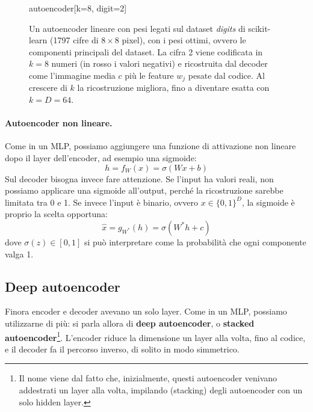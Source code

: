 \begin{figure}[htbp]
\begin{widget}{autoencoder}[k=8, digit=2]
\end{widget}
\caption{Un autoencoder lineare con pesi legati sul dataset \emph{digits} di scikit-learn (1797 cifre di $8 \times 8$ pixel), con i pesi ottimi, ovvero le componenti principali del dataset. La cifra 2 viene codificata in $k = 8$ numeri (in rosso i valori negativi) e ricostruita dal decoder come l'immagine media $c$ più le feature $w_j$ pesate dal codice. Al crescere di $k$ la ricostruzione migliora, fino a diventare esatta con $k = D = 64$.}
\label{fig:autoencoder}
\end{figure}

\paragraph{Autoencoder non lineare.} Come in un MLP, possiamo aggiungere una funzione di attivazione non lineare dopo il layer dell'encoder, ad esempio una sigmoide:
\[
    h = f_W(x) = \sigma(Wx + b)
\]
Sul decoder bisogna invece fare attenzione. Se l'input ha valori reali, non possiamo applicare una sigmoide all'output, perché la ricostruzione sarebbe limitata tra 0 e 1. Se invece l'input è binario, ovvero $x \in \{0, 1\}^D$, la sigmoide è proprio la scelta opportuna:
\[
    \hat{x} = g_{W^*}(h) = \sigma(W^*h + c)
\]
dove $\sigma(z) \in [0, 1]$ si può interpretare come la probabilità che ogni componente valga 1.

\subsection{Deep autoencoder}\label{sec:deep-autoencoder}
Finora encoder e decoder avevano un solo layer. Come in un MLP, possiamo utilizzarne di più: si parla allora di \textbf{deep autoencoder}, o \textbf{stacked autoencoder}\footnote{Il nome viene dal fatto che, inizialmente, questi autoencoder venivano addestrati un layer alla volta, impilando (stacking) degli autoencoder con un solo hidden layer.}. L'encoder riduce la dimensione un layer alla volta, fino al codice, e il decoder fa il percorso inverso, di solito in modo simmetrico.

